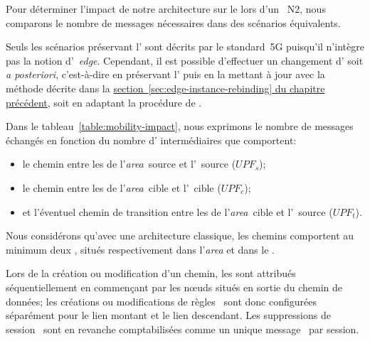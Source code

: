\documentclass[../main.tex]{subfiles}
\begin{document}
Pour déterminer l’impact de notre architecture sur le  lors d’un ~N2, nous comparons le nombre de messages nécessaires dans des scénarios équivalents.

Seuls les scénarios préservant l’ sont décrits par le standard~5G puisqu’il n’intègre pas la notion d’~\textit{edge}.
Cependant, il est possible d’effectuer un changement d’ soit \textit{a posteriori}, c’est-à-dire en préservant l’ puis en la mettant à jour avec la méthode décrite dans la \hyperref[ch:edge-services-integration]{section~\ref*{sec:edge-instance-rebinding} du chapitre précédent}, soit en adaptant la procédure de .

Dans le tableau~\ref{table:mobility-impact}, nous exprimons le nombre de messages~ échangés en fonction du nombre d’ intermédiaires que comportent:
\begin{itemize}
    \item le chemin entre les  de l’\textit{area}~source et l’~source ($\mathit{UPF_s}$);
    \item le chemin entre les  de l’\textit{area}~cible et l’~cible ($\mathit{UPF_c}$);
    \item et l’éventuel chemin de transition entre les  de l’\textit{area}~cible et l’~source ($\mathit{UPF_t}$).
\end{itemize}
Nous considérons qu’avec une architecture classique, les chemins comportent au minimum deux , situés respectivement dans l’\textit{area} et dans le .

Lors de la création ou modification d’un chemin, les  sont attribués séquentiellement en commençant par les nœuds situés en sortie du chemin de données; les créations ou modifications de règles~ sont donc configurées séparément pour le lien montant et le lien descendant.
Les suppressions de session~ sont en revanche comptabilisées comme un unique message~ par session.
\end{document}
